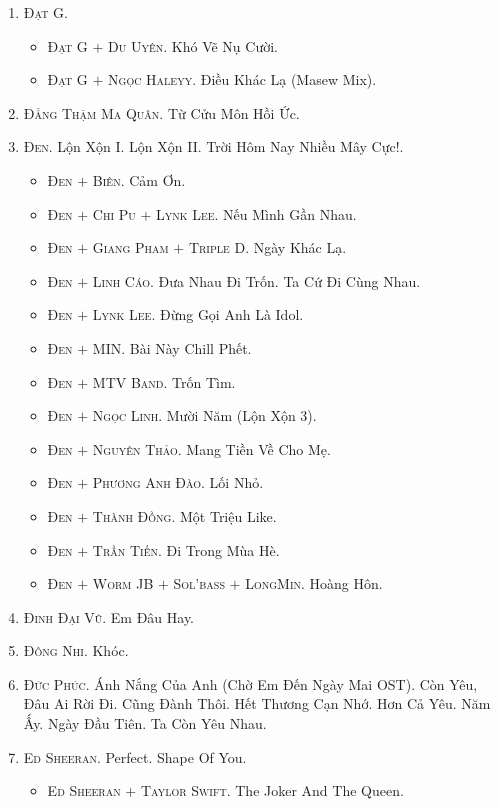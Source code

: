 \documentclass[oneside]{book}
\numberwithin{equation}{section}
\begin{document}
\begin{enumerate}
\begin{itemize}
	\end{itemize}
	\item \textsc{Đạt G.}
	\begin{itemize}
		\item \textsc{Đạt G $+$ Du Uyên.} Khó Vẽ Nụ Cười.
		\item \textsc{Đạt G $+$ Ngọc Haleyy.} Điều Khác Lạ (Masew Mix).
	\end{itemize}
	\item \textsc{Đẳng Thậm Ma Quân.} Từ Cửu Môn Hồi Ức.
	\item \textsc{Đen.} Lộn Xộn I. Lộn Xộn II. Trời Hôm Nay Nhiều Mây Cực!. 
	\begin{itemize}
		\item \textsc{Đen $+$ Biên.} Cảm Ơn.
		\item \textsc{Đen $+$ Chi Pu $+$ Lynk Lee.} Nếu Mình Gần Nhau.
		\item \textsc{Đen $+$ Giang Pham $+$ Triple D.} Ngày Khác Lạ.
		\item \textsc{Đen $+$ Linh Cáo.} Đưa Nhau Đi Trốn. Ta Cứ Đi Cùng Nhau.
		\item \textsc{Đen $+$ Lynk Lee.} Đừng Gọi Anh Là Idol.
		\item \textsc{Đen $+$ MIN.} Bài Này Chill Phết.
		\item \textsc{Đen $+$ MTV Band.} Trốn Tìm.
		\item \textsc{Đen $+$ Ngọc Linh.} Mười Năm (Lộn Xộn 3).
		\item \textsc{Đen $+$ Nguyên Thảo.} Mang Tiền Về Cho Mẹ.
		\item \textsc{Đen $+$ Phương Anh Đào.} Lối Nhỏ.
		\item \textsc{Đen $+$ Thành Đồng.} Một Triệu Like.
		\item \textsc{Đen $+$ Trần Tiến.} Đi Trong Mùa Hè.
		\item \textsc{Đen $+$ Worm JB $+$ Sol'bass $+$ LongMin.} Hoàng Hôn.
	\end{itemize}
	\item \textsc{Đinh Đại Vũ.} Em Đâu Hay.
	\item \textsc{Đông Nhi.} Khóc.
	\item \textsc{Đức Phúc.} Ánh Nắng Của Anh (Chờ Em Đến Ngày Mai OST). Còn Yêu, Đâu Ai Rời Đi. Cũng Đành Thôi. Hết Thương Cạn Nhớ. Hơn Cả Yêu. Năm Ấy. Ngày Đầu Tiên. Ta Còn Yêu Nhau.
	\item \textsc{Ed Sheeran.} Perfect. Shape Of You.
	\begin{itemize}
		\item \textsc{Ed Sheeran $+$ Taylor Swift.} The Joker And The Queen.

\end{itemize}
\end{enumerate}
\end{document}
